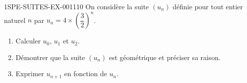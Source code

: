 \begin{exercice}{1SPE-SUITES-EX-001}{1}{10}
On considère la suite $(u_n)$ définie pour tout entier naturel $n$ par
$u_n = 4 \times \left(\dfrac{3}{2}\right)^{n}$.
\begin{enumerate}
  \item Calculer $u_0$, $u_1$ et $u_2$.
  \item Démontrer que la suite $(u_n)$ est géométrique et préciser sa raison.
  \item Exprimer $u_{n+1}$ en fonction de $u_n$.
\end{enumerate}
\end{exercice}
